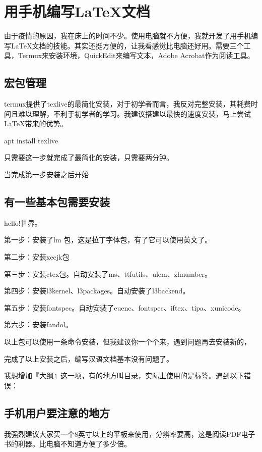 \chapter{用手机编写\LaTeX 文档}

由于疫情的原因，我在床上的时间不少。使用电脑就不方便，我就开发了用手机编写\LaTeX 文档的技能。其实还挺方便的，让我看感觉比电脑还好用。需要三个工具，Termux来安装环境，QuickEdit来编写文本，Adobe Acrobat作为阅读工具。

\section{宏包管理}

termux提供了texlive的最简化安装，对于初学者而言，我反对完整安装，其耗费时间且难以理解，不利于初学者的学习。我建议搭建以最快的速度安装，马上尝试\LaTeX 带来的优势。

apt install texlive

只需要这一步就完成了最简化的安装，只需要两分钟。

当完成第一步安装之后开始

\section{有一些基本包需要安装}
hello!世界。

第一步：安装了lm 包，这是拉丁字体包，有了它可以使用英文了。

第二步：安装xecjk包

第三步：安装ctex包。自动安装了ms、ttfutils、ulem、zhnumber。

第四步：安装l3kernel、l3packages。自动安装了l3backend。

第五步：安装fontspec。自动安装了euenc、fontspec、iftex、tipa、xunicode。

第六步：安装fandol。

以上包可以使用一条命令安装，但我建议你一个个来，遇到问题再去安装新的，

完成了以上安装之后，编写汉语文档基本没有问题了。

我想增加『大纲』这一项，有的地方叫目录，实际上使用的是标签。遇到以下错误：

\section{手机用户要注意的地方}

我强烈建议大家买一个8英寸以上的平板来使用，分辨率要高，这是阅读PDF电子书的利器。比电脑不知道方便了多少倍。

